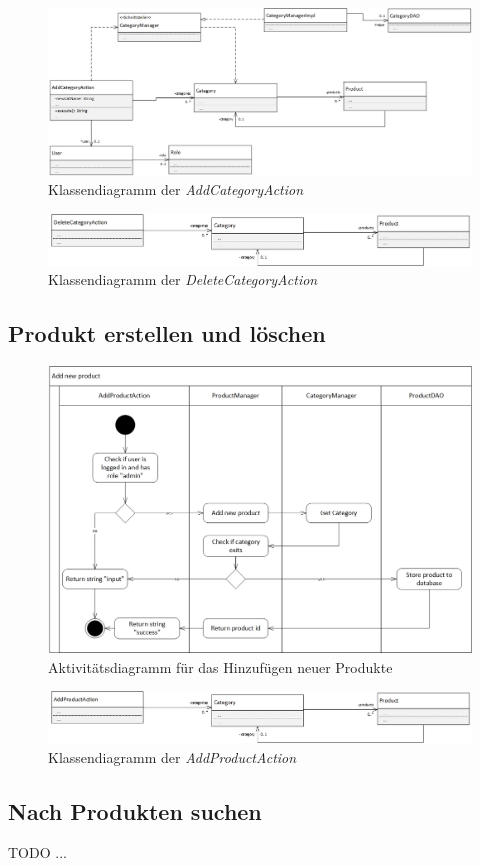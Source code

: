 \documentclass[12pt,a4paper]{article}
\begin{document}
	\begin{figure}[H]
		\centering
		\includegraphics[scale=0.5]{diagrams/AddCategoryAction_class.jpg}
		\caption{Klassendiagramm der \textit{AddCategoryAction}}
	\end{figure}

	\begin{figure}[H]
		\centering
		\includegraphics[scale=0.5]{diagrams/DeleteCategoryAction_class.jpg}
		\caption{Klassendiagramm der \textit{DeleteCategoryAction}}
	\end{figure}

	\subsection{Produkt erstellen und löschen}
	\begin{figure}[H]
		\centering
		\includegraphics[scale=0.5]{diagrams/AddProductAction_activity.jpg}
		\caption{Aktivitätsdiagramm für das Hinzufügen neuer Produkte}
	\end{figure}

	\begin{figure}[H]
		\centering
		\includegraphics[scale=0.5]{diagrams/AddProductAction_class.jpg}
		\caption{Klassendiagramm der \textit{AddProductAction}}
	\end{figure}
	
	\subsection{Nach Produkten suchen}
	TODO ...
	
\end{document}
